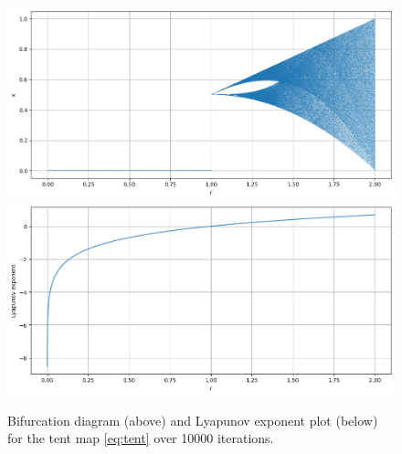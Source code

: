 \begin{exmp}
    \begin{figure}
        \centering
        \includegraphics[width=\linewidth]{Bifurcation Images/bifurcation_tent.png}
        \includegraphics[width=\linewidth]{Bifurcation Images/lypaunov_tent.png}
        \caption{Bifurcation diagram (above) and Lyapunov exponent plot (below) for the tent map \eqref{eq:tent} over 10000 iterations.}
        \label{fig:lyapunov_tent}
    \end{figure}
\end{exmp}

